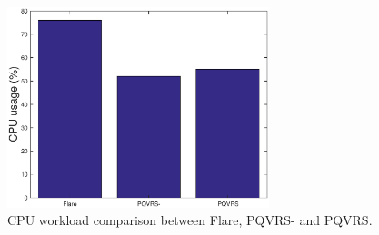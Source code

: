    \begin{figure}
  \centering
  \includegraphics[width=3in]{images/CPUworkload.eps}
  \caption{CPU workload comparison between Flare, PQVRS- and PQVRS.}
  \label{CPUworkload}
  \end{figure}